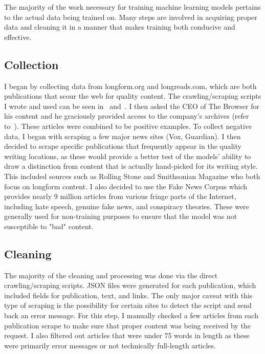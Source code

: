 The majority of the work necessary for training machine learning models pertains to the actual data being trained on. Many steps are involved in acquiring proper data and cleaning it in a manner that makes training both conducive and effective.

\subsection{Collection}
I began by collecting data from longform.org and longreads.com, which are both publications that scour the web for quality content. The crawling/scraping scripts I wrote and used can be seen in~ and~. I then asked the CEO of The Browser for his content and he graciously provided access to the company’s archives (refer to~). These articles were combined to be positive examples. To collect negative data, I began with scraping a few major news sites (Vox, Guardian). I then decided to scrape specific publications that frequently appear in the quality writing locations, as these would provide a better test of the models' ability to draw a distinction from content that is actually hand-picked for its writing style. This included sources such as Rolling Stone and Smithsonian Magazine who both focus on longform content. I also decided to use the Fake News Corpus which provides nearly 9 million articles from various fringe parts of the Internet, including hate speech, genuine fake news, and conspiracy theories. These were generally used for non-training purposes to ensure that the model was not susceptible to "bad" content.

\subsection{Cleaning}
The majority of the cleaning and processing was done via the direct crawling/scraping scripts. JSON files were generated for each publication, which included fields for publication, text, and links. The only major caveat with this type of scraping is the possibility for certain sites to detect the script and send back an error message. For this step, I manually checked a few articles from each publication scrape to make sure that proper content was being received by the request. I also filtered out articles that were under 75 words in length as these were primarily error messages or not technically full-length articles.

